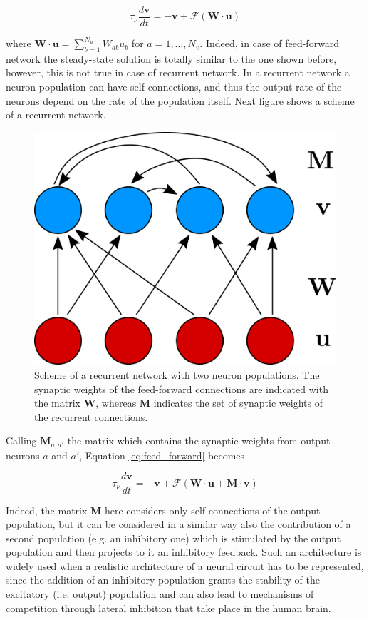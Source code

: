 \documentclass[a4paper, 12pt, twoside, openright]{book}
\begin{document}
\begin{equation}
    \label{eq:feed_forward}
    \tau_{\nu}\dfrac{d\mathbf{v}}{dt}=-\mathbf{v}+\mathbf{\mathcal{F} }(\mathbf{W}\cdot\mathbf{u})
\end{equation}

where $\mathbf{W}\cdot\mathbf{u}=\sum_{b=1}^{N_{u}}W_{ab}u_b$ for $a=1,\ldots,N_{v}$. Indeed, in case of feed-forward network the steady-state solution is totally similar to the one shown before, however, this is not true in case of recurrent network. In a recurrent network a neuron population can have self connections, and thus the output rate of the neurons depend on the rate of the population itself. Next figure shows a scheme of a recurrent network.

\begin{figure}[H]
    \centering
    \includegraphics[width=0.5\columnwidth]{figures/recurrent_rate_model.png}
    \caption{Scheme of a recurrent network with two neuron populations. The synaptic weights of the feed-forward connections are indicated with the matrix $\mathbf{W}$, whereas $\mathbf{M}$ indicates the set of synaptic weights of the recurrent connections.}
    \label{fig:recurrent_network}
\end{figure}

 Calling $\mathbf{M}_{a,a'}$ the matrix which contains the synaptic weights from output neurons $a$ and $a'$, Equation \eqref{eq:feed_forward} becomes

\begin{equation}
    \label{eq:recurrent}
    \tau_{\nu}\dfrac{d\mathbf{v}}{dt}=-\mathbf{v}+\mathbf{\mathcal{F} }(\mathbf{W}\cdot\mathbf{u} + \mathbf{M}\cdot\mathbf{v})
\end{equation}

Indeed, the matrix $\mathbf{M}$ here considers only self connections of the output population, but it can be considered in a similar way also the contribution of a second population (e.g. an inhibitory one) which is stimulated by the output population and then projects to it an inhibitory feedback. Such an architecture is widely used when a realistic architecture of a neural circuit has to be represented, since the addition of an inhibitory population grants the stability of the excitatory (i.e. output) population and can also lead to mechanisms of competition through lateral inhibition that take place in the human brain.
\end{document}
